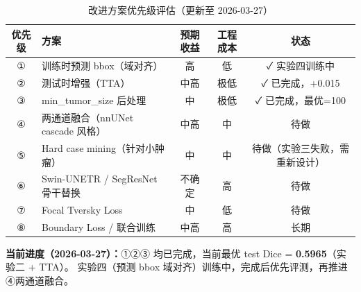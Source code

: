 \documentclass{article}
\begin{document}
	\begin{table}[H]
		\centering
		\caption{改进方案优先级评估（更新至 2026-03-27）}
		\label{tab:improvement-plan}
		\renewcommand{\arraystretch}{1.3}
		\begin{tabular}{clccc}
			\toprule
			\textbf{优先级} & \textbf{方案} & \textbf{预期收益} & \textbf{工程成本} & \textbf{状态} \\
			\midrule
			① & 训练时预测 bbox（域对齐） & 高   & 低   & ✓ 实验四训练中 \\
			② & 测试时增强（TTA）         & 中高 & 极低 & ✓ 已完成，+0.015 \\
			③ & min\_tumor\_size 后处理    & 中   & 极低 & ✓ 已完成，最优=100 \\
			④ & 两通道融合（nnUNet cascade 风格） & 中高 & 中 & 待做 \\
			⑤ & Hard case mining（针对小肿瘤） & 中 & 中 & 待做（实验三失败，需重新设计） \\
			⑥ & Swin-UNETR / SegResNet 骨干替换 & 不确定 & 高 & 待做 \\
			⑦ & Focal Tversky Loss         & 中   & 低   & 待做 \\
			⑧ & Boundary Loss / 联合训练  & 中高 & 高   & 长期 \\
			\bottomrule
		\end{tabular}
	\end{table}

	\noindent\textbf{当前进度（2026-03-27）：}①②③ 均已完成，当前最优 test Dice = \textbf{0.5965}（实验二 + TTA）。
	实验四（预测 bbox 域对齐）训练中，完成后优先评测，再推进④两通道融合。
\end{document}
